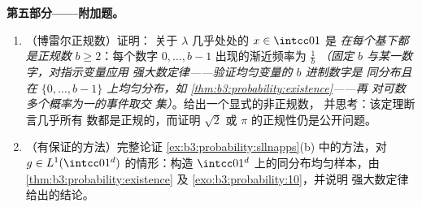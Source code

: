 \begin{problem}
\medskip
\noindent\textbf{第五部分——附加题。}
\begin{enumerate}[resume]
  \item （博雷尔正规数）证明：
        关于 $\lambda$ 几乎处处的 $x \in \intcc01$ 是
        \emph{在每个基下都是正规数} $b \geq 2$：每个数字
        $0, \dots, b-1$ 出现的渐近频率为
        $\frac1b$ \emph{（固定 $b$ 与某一数字，对指示变量应用
        强大数定律——验证均匀变量的
        $b$ 进制数字是
        同分布且在 $\{0,\dots,b-1\}$ 上均匀分布，如
        \cref{thm:b3:probability:existence}——再
        对可数多个概率为一的事件取交
        集）}。给出一个显式的非正规数，
        并思考：该定理断言几乎所有
        数都是正规的，而证明 $\sqrt2$ 或
        $\pi$ 的正规性仍是公开问题。
  \item （有保证的方法）完整论证
        \cref{ex:b3:probability:sllnapps}(b) 中的方法，对
        $g \in L^1(\intcc01^d)$ 的情形：构造
        $\intcc01^d$ 上的同分布均匀样本，由
        \cref{thm:b3:probability:existence} 及
        \cref{exo:b3:probability:10}，并说明
        强大数定律给出的结论。
\end{enumerate}


\end{problem}

